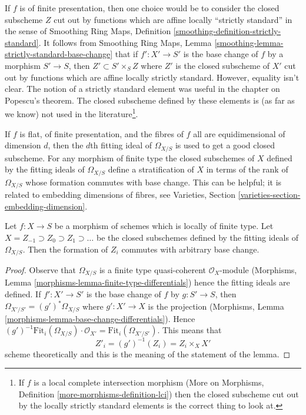 \medskip\noindent
If $f$ is of finite presentation, then one choice would be to consider the
closed subscheme $Z$ cut out by functions which are affine locally
``strictly standard'' in the sense of
Smoothing Ring Maps, Definition \ref{smoothing-definition-strictly-standard}.
It follows from
Smoothing Ring Maps, Lemma \ref{smoothing-lemma-strictly-standard-base-change}
that if $f' : X' \to S'$ is the base change of $f$ by a morphism
$S' \to S$, then $Z' \subset S' \times_S Z$ where $Z'$ is the
closed subscheme of $X'$ cut out by functions which are affine
locally strictly standard. However, equality isn't clear.
The notion of a strictly standard element was useful in the chapter on
Popescu's theorem. The closed subscheme defined by these elements is
(as far as we know) not used in the literature\footnote{If $f$ is a
local complete intersection morphism
(More on Morphisms, Definition \ref{more-morphisms-definition-lci})
then the closed subscheme cut out by the locally strictly standard
elements is the correct thing to look at.}.

\medskip\noindent
If $f$ is flat, of finite presentation, and the fibres of $f$
all are equidimensional of dimension $d$, then the $d$th fitting ideal
of $\Omega_{X/S}$ is used to get a good closed subscheme. For any
morphism of finite type the closed subschemes of $X$ defined by the
fitting ideals of $\Omega_{X/S}$ define a stratification of $X$
in terms of the rank of $\Omega_{X/S}$  whose formation commutes with
base change. This can be helpful; it is related to embedding dimensions of
fibres, see Varieties, Section \ref{varieties-section-embedding-dimension}.

\begin{lemma}
\label{lemma-base-change-and-fitting-ideal-omega}
Let $f : X \to S$ be a morphism of schemes which is locally of finite type.
Let $X = Z_{-1} \supset Z_0 \supset Z_1 \supset \ldots$
be the closed subschemes defined by the fitting ideals
of $\Omega_{X/S}$. Then the formation of $Z_i$ commutes
with arbitrary base change.
\end{lemma}

\begin{proof}
Observe that $\Omega_{X/S}$ is a finite type quasi-coherent
$\mathcal{O}_X$-module
(Morphisms, Lemma \ref{morphisms-lemma-finite-type-differentials})
hence the fitting ideals are defined. If $f' : X' \to S'$
is the base change of $f$ by $g : S' \to S$, then
$\Omega_{X'/S'} = (g')^*\Omega_{X/S}$ where $g' : X' \to X$
is the projection
(Morphisms, Lemma \ref{morphisms-lemma-base-change-differentials}).
Hence $(g')^{-1}\text{Fit}_i(\Omega_{X/S}) \cdot \mathcal{O}_{X'} =
\text{Fit}_i(\Omega_{X'/S'})$. This means that
$$
Z'_i = (g')^{-1}(Z_i) = Z_i \times_X X'
$$
scheme theoretically and this is the meaning of the statement of
the lemma.
\end{proof}

